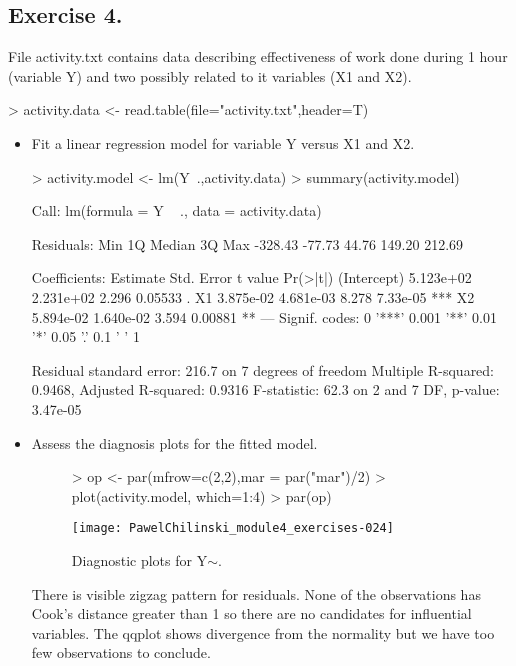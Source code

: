 \documentclass[a4paper]{article}
\begin{document}
\subsection{Exercise 4.} File activity.txt contains data describing effectiveness of work done during 1 hour (variable Y) and two possibly
related to it variables (X1 and X2).
\begin{Schunk}
\begin{Sinput}
> activity.data <- read.table(file="activity.txt",header=T)
\end{Sinput}
\end{Schunk}
\begin{itemize}
\item Fit a linear regression model for variable Y versus X1 and X2.
\begin{Schunk}
\begin{Sinput}
> activity.model <- lm(Y~.,activity.data)	
> summary(activity.model)
\end{Sinput}
\begin{Soutput}
Call:
lm(formula = Y ~ ., data = activity.data)

Residuals:
    Min      1Q  Median      3Q     Max 
-328.43  -77.73   44.76  149.20  212.69 

Coefficients:
             Estimate Std. Error t value Pr(>|t|)    
(Intercept) 5.123e+02  2.231e+02   2.296  0.05533 .  
X1          3.875e-02  4.681e-03   8.278 7.33e-05 ***
X2          5.894e-02  1.640e-02   3.594  0.00881 ** 
---
Signif. codes:  0 '***' 0.001 '**' 0.01 '*' 0.05 '.' 0.1 ' ' 1

Residual standard error: 216.7 on 7 degrees of freedom
Multiple R-squared:  0.9468,	Adjusted R-squared:  0.9316 
F-statistic:  62.3 on 2 and 7 DF,  p-value: 3.47e-05
\end{Soutput}
\end{Schunk}
\item Assess the diagnosis plots for the fitted model.
\begin{figure}[H]
\begin{center}
\begin{Schunk}
\begin{Sinput}
> op <- par(mfrow=c(2,2),mar = par("mar")/2)
> plot(activity.model, which=1:4)
> par(op)
\end{Sinput}
\end{Schunk}
\texttt{[image: PawelChilinski\_module4\_exercises-024]}
\caption{Diagnostic plots for Y$\sim .$}
\end{center}
\end{figure}
There is visible zigzag pattern for residuals. None of the observations has
Cook's distance greater than 1 so there are no candidates for influential
variables. The qqplot shows divergence from the normality but we have too few
observations to conclude.


\end{itemize}
\end{document}
